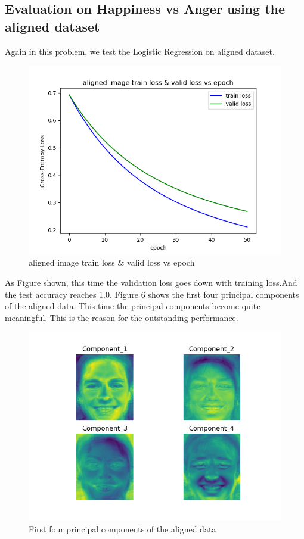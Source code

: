 \documentclass{article} %
\begin{document}
\subsection {Evaluation on Happiness vs Anger using the aligned dataset}
Again in this problem, we test the Logistic Regression on aligned dataset.
\begin{figure}[h]
	\centering
	\includegraphics[scale=0.5]{./graph/aligned_tvloss.png}
	\caption{aligned image train loss \& valid loss vs epoch}
\end{figure}
As Figure shown, this time the validation loss goes down with training loss.And the test accuracy reaches 1.0. Figure 6 shows the first four principal components of the aligned data. This time the principal components become quite meaningful. This is the reason for the outstanding performance.
\begin{figure}[h]
	\centering
	\includegraphics[scale=0.5]{./graph/pca_aligned.png}
	\caption{First four principal components of the aligned data}
\end{figure}
\end{document}
